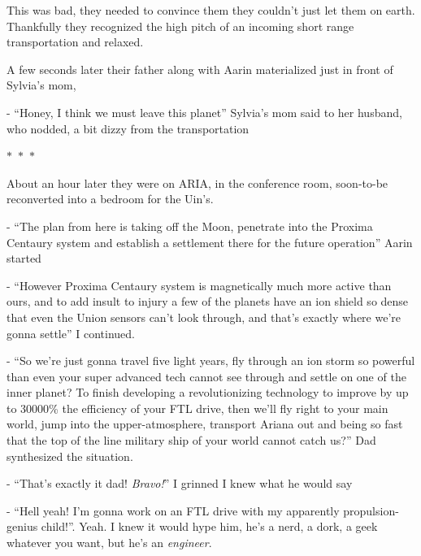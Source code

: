 \documentclass[colorlinks,12pt,a4paper]{book}
\newcommand\sep{\begin{center}
  \boldmath $\ast$~$\ast$~$\ast$
\end{center}}
\begin{document}
 This was bad, they needed to convince them they couldn't just let them on earth. Thankfully they recognized the high 
 pitch of an incoming short range transportation and relaxed.\par
 \bigskip
 
 A few seconds later their father along with Aarin materialized just in front of Sylvia's mom,\par
 \bigskip
 
 - “Honey, I think we must leave this planet” Sylvia's mom said to her husband, who nodded, a bit dizzy from the 
 transportation
 
 \sep
 
 About an hour later they were on ARIA, in the conference room, soon-to-be reconverted into a bedroom for the Uin's.\par
 \bigskip
 
 - “The plan from here is taking off the Moon, penetrate into the Proxima Centaury system and establish a settlement 
 there for the future operation” Aarin started\par
 \bigskip
 
 - “However Proxima Centaury system is magnetically much more active than ours, and to add insult to injury a few of the 
 planets have an ion shield so dense that even the Union sensors can't look through, and that's exactly where we're 
 gonna settle” I continued.\par
 \bigskip
 
 - “So we're just gonna travel five light years, fly through an ion storm so powerful than even your super advanced tech 
 cannot see through and settle on one of the inner planet? To finish developing a revolutionizing technology to improve 
 by up to 30000\% the efficiency of your FTL drive, then we'll fly right to your main world, jump into the upper-atmosphere, 
 transport Ariana out and being so fast that the top of the line military ship of your world cannot catch us?” 
 Dad synthesized the situation.\par
 \bigskip
 
 - “That's exactly it dad! \textit{Bravo!}” I grinned I knew what he would say\par
 \bigskip
 
 - “Hell yeah! I'm gonna work on an FTL drive with my apparently propulsion-genius child!”. Yeah. I knew it would hype him,
  he's a nerd, a dork, a geek whatever you want, but he's an \textit{engineer}.\par
  \bigskip
 
\end{document}
